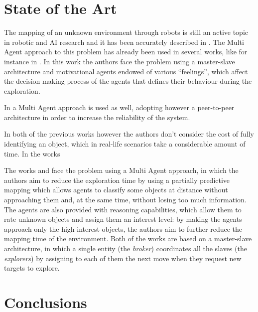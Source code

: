\documentclass[a4paper, 10pt, conference]{ieeeconf}      %
\begin{document}
\section{State of the Art}
The mapping of an unknown environment through robots is still an active topic in robotic and AI research and it has been accurately described in \cite{thrun2002robotic}. The Multi Agent approach to this problem has already been used in several works, like for instance in \cite{macedo2004exploration}. In this work the authors face the problem using a master-slave architecture and motivational agents endowed of various ``feelings'', which affect the decision making process of the agents that defines their behaviour during the exploration. 

In \cite{sheng2005peer} a Multi Agent approach is used as well, adopting however a peer-to-peer architecture in order to increase the reliability of the system. 


In both of the previous works however the authors don't consider the cost of fully identifying an object, which in real-life scenarios take a considerable amount of time. In the works 

The works \cite{tavaresgaspar} and \cite{macedo2011uncertainty} face the problem using a Multi Agent approach, in which the authors aim to reduce the exploration time by using a partially predictive mapping which allows agents to classify some objects at distance without approaching them and, at the same time, without losing too much information. The agents are also provided with reasoning capabilities, which allow them to rate unknown objects and assign them an interest level: by making the agents approach only the high-interest objects, the authors aim to further reduce the mapping time of the environment. Both of the works are based on a master-slave architecture, in which a single entity (the \emph{broker}) coordinates all the slaves (the \emph{explorers}) by assigning to each of them the next move when they request new targets to explore. 


\section{Conclusions}


\addtolength{\textheight}{-12cm}   %
\end{document}
